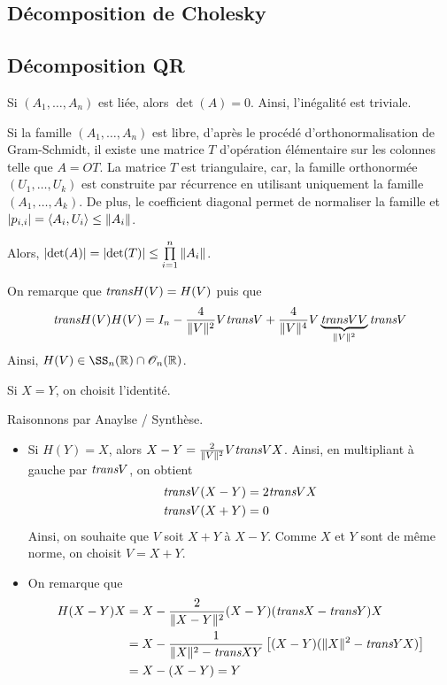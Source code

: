 \subsection{Décomposition de Cholesky}


\subsection{Décomposition QR}

Si $(A_1,\ldots,A_n)$ est liée, alors $\det(A) = 0$. Ainsi, l'inégalité est triviale.

Si la famille $(A_1,\ldots,A_n)$ est libre, d'après le procédé d'orthonormalisation de Gram-Schmidt, il existe une matrice $T$ d'opération élémentaire sur les colonnes telle que $A = O T$. La matrice $T$ est triangulaire, car, la famille orthonormée $(U_1,\ldots,U_k)$ est construite par récurrence en utilisant uniquement la famille $(A_1,\ldots,A_k)$. De plus, le coefficient diagonal permet de normaliser la famille et $\abs{p_{i,i}} = \langle A_i, U_i\rangle \leq \Vert A_i \Vert$.

Alors, $\abs{\det(A)} = \abs{\det(T)} \leq \prod\limits_{i=1}^n \Vert A_i \Vert$.

On remarque que $\textit{trans}{H(V)} = H(V)$ puis que
\[
\textit{trans}{H(V)} H(V) = I_n - \frac{4}{\Vert V \Vert^2} V \textit{trans}{V} + \frac{4}{\Vert V \Vert^4} V \underbrace{\textit{trans}{V} V}_{\Vert V \Vert^2} \textit{trans}{V}
\]
Ainsi, $H(V) \in \SS_n(\R) \cap \mathscr{O}_n(\R)$.

Si $X = Y$, on choisit l'identité.

Raisonnons par Anaylse / Synthèse.
\begin{itemize}
\item Si $H(Y) = X$, alors $X - Y = \frac{2}{\Vert V \Vert^2} V \textit{trans}{V} X$. Ainsi, en multipliant à gauche par $\textit{trans}{V}$, on obtient
\begin{align*}
\textit{trans}{V} (X - Y) &= 2 \textit{trans}{V} X \\
\textit{trans}{V} (X + Y) &= 0
\end{align*}
Ainsi, on souhaite que $V$ soit $X + Y$ à $X - Y$. Comme $X$ et $Y$ sont de même norme, on choisit $V = X + Y$.

\item On remarque que
\begin{align*}
H(X - Y) X &= X - \frac{2}{\Vert X - Y \Vert^2} (X - Y) (\textit{trans}{X} - \textit{trans}{Y}) X \\
&= X - \frac{1}{\Vert X \Vert^2 - \textit{trans}{X}Y} \left[(X - Y) (\Vert X \Vert^2 - \textit{trans}{Y} X)\right]\\
&= X - (X - Y) = Y
\end{align*}
\end{itemize}

